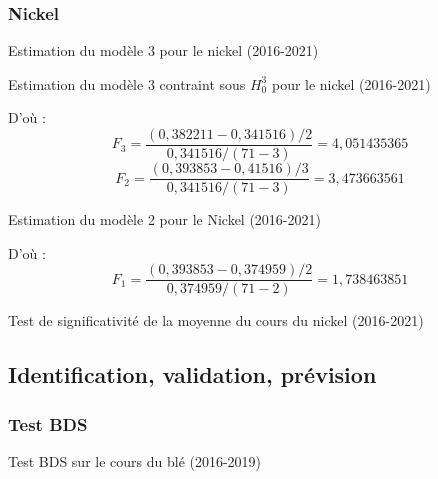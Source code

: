 \documentclass[12pt,a4paper]{article}
\begin{document}
\subsubsection*{Nickel}
\begin{table}[H]
    \centering
    \caption{Estimation du modèle 3 pour le nickel (2016-2021)}
    \label{tab:mod3_nickel21}
    \sffamily
    \resizebox{0.8\textwidth}{!}{}
\end{table}

\begin{table}[H]
    \centering
    \caption{Estimation du modèle 3 contraint sous $H_{0}^{3}$ pour le nickel (2016-2021)}
    \label{tab:mod3cont_nickel21}
    \sffamily
    \resizebox{0.8\textwidth}{!}{}
\end{table}
D'où : 
\begin{equation*}
    F_{3} = \frac{(0,382211 -  0,341516)/2}{0,341516/(71-3)} = 4,051435365
\end{equation*}
\begin{equation*}
    F_{2} = \frac{(0,393853 -  0,41516)/3}{0,341516/(71-3)} = 3,473663561
\end{equation*}
\begin{table}[H]
    \centering
    \caption{Estimation du modèle 2 pour le Nickel (2016-2021)}
    \label{tab:mod2_nickel21}
    \sffamily
    \resizebox{0.8\textwidth}{!}{}
\end{table}
D'où : 
\begin{equation*}
    F_{1} = \frac{(0,393853 -  0,374959)/2}{0,374959 /(71-2)} = 1,738463851
\end{equation*}
\begin{table}[H]
    \centering
    \caption{Test de significativité de la moyenne du cours du nickel (2016-2021)}
    \label{tab:testmoy_nickel21}
    \sffamily
    \resizebox{0.6\textwidth}{!}{}
\end{table}


\subsection{Identification, validation, prévision}
\subsubsection{Test BDS}\label{appendix:bds}
\begin{table}[H]
    \centering
    \caption{Test BDS sur le cours du blé (2016-2019)}
    \sffamily
    \resizebox{0.9\textwidth}{!}{}
\end{table}
\end{document}
